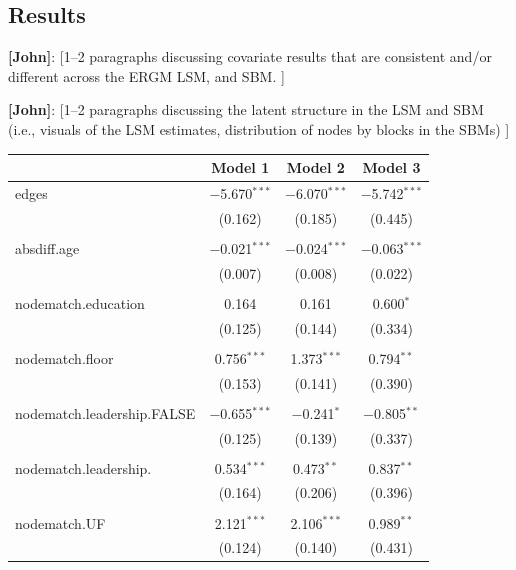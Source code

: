 \documentclass[fleqn,12pt]{wlscirep}
\begin{document}
\subsection{Results}

 {\bf [John]}: [1--2 paragraphs discussing covariate results that are consistent and/or different across the ERGM LSM, and SBM. ]


 {\bf [John]}: [1--2 paragraphs discussing the latent structure in the LSM and SBM (i.e., visuals of the LSM estimates, distribution of nodes by blocks in the SBMs) ]

\begin{table}
\begin{center}
\begin{tabular}{l c c c }
\hline
 & Model 1 & Model 2 & Model 3 \\
\hline
 edges & $-$5.670$^{***}$ & $-$6.070$^{***}$ & $-$5.742$^{***}$ \\ 
  & (0.162) & (0.185) & (0.445) \\ 
  & & & \\ 
 absdiff.age & $-$0.021$^{***}$ & $-$0.024$^{***}$ & $-$0.063$^{***}$ \\ 
  & (0.007) & (0.008) & (0.022) \\ 
  & & & \\ 
 nodematch.education & 0.164 & 0.161 & 0.600$^{*}$ \\ 
  & (0.125) & (0.144) & (0.334) \\ 
  & & & \\ 
 nodematch.floor & 0.756$^{***}$ & 1.373$^{***}$ & 0.794$^{**}$ \\ 
  & (0.153) & (0.141) & (0.390) \\ 
  & & & \\ 
 nodematch.leadership.FALSE & $-$0.655$^{***}$ & $-$0.241$^{*}$ & $-$0.805$^{**}$ \\ 
  & (0.125) & (0.139) & (0.337) \\ 
  & & & \\ 
 nodematch.leadership. & 0.534$^{***}$ & 0.473$^{**}$ & 0.837$^{**}$ \\ 
  & (0.164) & (0.206) & (0.396) \\ 
  & & & \\ 
 nodematch.UF & 2.121$^{***}$ & 2.106$^{***}$ & 0.989$^{**}$ \\ 
  & (0.124) & (0.140) & (0.431) \\ 

\end{tabular}
\end{center}
\end{table}
\end{document}
